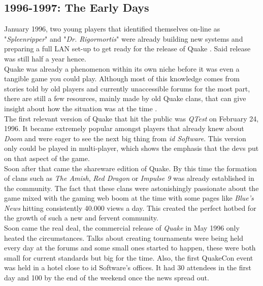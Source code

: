 \subsection{1996-1997: The Early Days}

January 1996, two young players that identified themselves on-line as "\textit{Spleenripper}" and "\textit{Dr. Rigormortis}" were already building new systems and preparing a full LAN set-up to get ready for the release of Quake \citep{clanHistory}. Said release was still half a year hence.\\

Quake was already a phenomenon within its own niche before it was even a tangible game you could play.  Although most of this knowledge comes from stories told by old players and currently unaccessible forums for the most part, there are still a few resources, mainly made by old Quake clans, that can give insight about how the situation was at the time \citep{clanHistory}.\\

The first relevant version of Quake that hit the public was \textit{QTest} \citep{qtest} on February 24, 1996. It became extremely popular amongst players that already knew about \textit{Doom} \citep{game:doom} and were eager to see the next big thing from \textit{id Software}. This version only could be played in multi-player, which shows the emphasis that the devs put on that aspect of the game.\\

Soon after that came the shareware edition of Quake. By this time the formation of clans such as \textit{The Amish}, \textit{Red Dragon} or \textit{Impulse 9} was already established in the community. The fact that these clans were astonishingly passionate about the game mixed with the gaming web boom at the time with some pages like \textit{Blue's News} hitting consistently 40.000 views a day. This created the perfect hotbed for the growth of such a new and fervent community.\\

Soon came the real deal, the commercial release of \textit{Quake} \citep{game:quake1} in May 1996 only heated the circumstances. Talks about creating tournaments were being held every day at the forums and some small ones started to happen, these were both small for current standards but big for the time. Also, the first QuakeCon \citep{quakecon} event was held in a hotel close to id Software's offices. It had 30 attendees in the first day and 100 by the end of the weekend once the news spread out.\\

